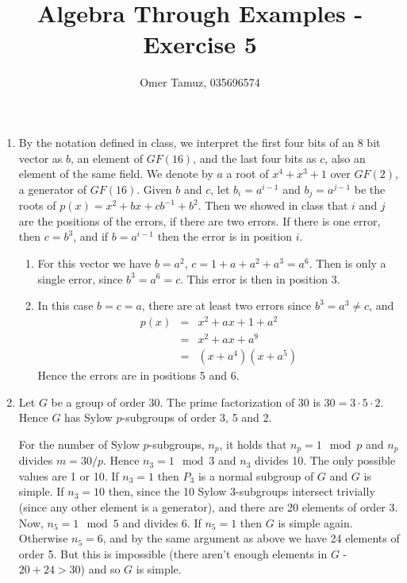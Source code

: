 \documentclass[11pt]{article} \usepackage{amssymb}
\begin{document}
\title{Algebra Through Examples - Exercise 5}

 \author{Omer Tamuz, 035696574}
\maketitle


\begin{enumerate}
\item 
  By the notation defined in class, we interpret the first four bits of
  an 8 bit vector as $b$, an element of $GF(16)$, and the last four
  bits as $c$, also an element of the same field. We denote by $a$ a root of
  $x^4+x^3+1$ over $GF(2)$, a generator
  of $GF(16)$. Given $b$ and $c$, let $b_i=a^{i-1}$ and $b_j=a^{j-1}$ be the 
  roots of
  $p(x)=x^2+bx+cb^{-1}+b^2$. Then we showed in class that $i$ and $j$ are the 
  positions of the errors, if there are two errors. If there is one error, then
  $c=b^3$, and if $b=a^{i-1}$ then the error is in position $i$. 
  \begin{enumerate}
  \item 
    For this vector we have $b=a^2$, $c=1+a+a^2+a^3=a^6$. Then is only 
    a single error, since $b^3= a^6=c$. This error is then in position 3.
  \item
    In this case $b=c=a$, there are at least two errors since 
    $b^3=a^3\neq c$, and
    \begin{eqnarray*}
      p(x)&=& x^2+ax+1+a^2
      \\ &=&  x^2+ax+a^9
      \\ &=& (x+a^4)(x+a^5)
    \end{eqnarray*}
    Hence the errors are in positions 5 and 6.
  \end{enumerate}
\item
  Let $G$ be a group of order 30. The prime factorization of 30 is 
  $30=3 \cdot 5 \cdot 2$. 
  Hence $G$ has Sylow $p$-subgroups of order 3, 5 and 2. 

  For the number of Sylow $p$-subgroups, $n_p$, it holds that $n_p=1\mod p$ and
  $n_p$ divides $m=30/p$. Hence $n_3=1 \mod 3$ and $n_3$ divides 10. The only
  possible values are 1 or 10. If $n_3=1$ then $P_3$ is a normal subgroup 
  of $G$ and $G$ is simple. If $n_3=10$ then, since the 10 Sylow 3-subgroups
  intersect trivially (since any other element is a generator), and there
  are 20 elements of order 3. Now, $n_5=1\mod 5$ and divides 6. If $n_5=1$ then
  $G$ is simple again. Otherwise $n_5=6$, and by the same argument as above
  we have 24 elements of order 5. But this is impossible (there aren't enough
  elements in $G$ - $20+24>30$) and so $G$ is simple.


\end{enumerate}
\end{document}
